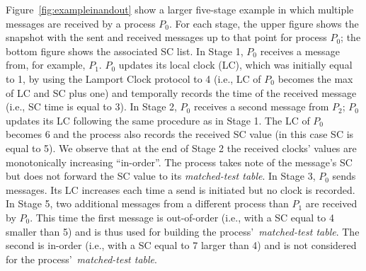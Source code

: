 Figure~\ref{fig:exampleinandout} show a larger five-stage example in
which multiple messages are received by a process $P_0$. For each
stage, the upper figure shows the snapshot with the sent and received
messages up to that point for process $P_0$; the bottom figure shows
the associated SC list. In Stage 1, $P_0$ receives a message from, for
example, $P_1$. $P_0$ updates its local clock (LC), which was
initially equal to 1, by using the Lamport Clock protocol to 4 (i.e.,
LC of $P_0$ becomes the max of LC and SC plus one) and temporally
records the time of the received message (i.e., SC time is equal to
3). In Stage 2, $P_0$ receives a second message from $P_2$; $P_0$
updates its LC following the same procedure as in Stage 1. The LC of
$P_0$ becomes 6 and the process also records the received SC value (in
this case SC is equal to 5). We observe that at the end of Stage 2 the
received clocks' values are monotonically increasing ``in-order''. The
process takes note of the message's SC but does not forward the SC
value to its \textit{matched-test table}. In Stage 3, $P_0$ sends
messages. Its LC increases each time a send is initiated but no
clock is recorded. In Stage 5, two additional messages from a
different process than $P_1$ are received by $P_0$. This time the
first message is out-of-order (i.e., with a SC equal to 4 smaller than
5) and is thus used for building the process'~\textit{matched-test
  table}. The second is in-order (i.e., with a SC equal to 7 larger
than 4) and is not considered for the process'~\textit{matched-test
  table}.
